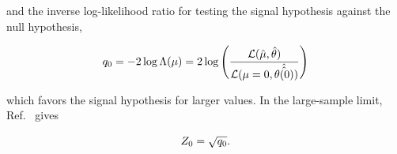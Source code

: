 \documentclass[paper/ddppaper2.tex]{subfiles}
\begin{document}
\noindent and the inverse log-likelihood ratio for testing the signal hypothesis against the null hypothesis,

\begin{equation}
\label{eq:inverse_log_likelihood_ratio}
    \invllratio = - 2 \log \plratio = 2 \log \left( \dfrac{\likelihood(\hat{\param}, \hat{\nparam})}{\likelihood(\param = 0, \hat{\hat{\nparam(0)}})} \right)
\end{equation}

\noindent which favors the signal hypothesis for larger values. In the large-sample limit, Ref.~\cite{Cowan_and_Eilam_PL_formulation} gives

\begin{equation}
    Z_0 = \sqrt{{q_{0}}}. 
\end{equation}
\end{document}
